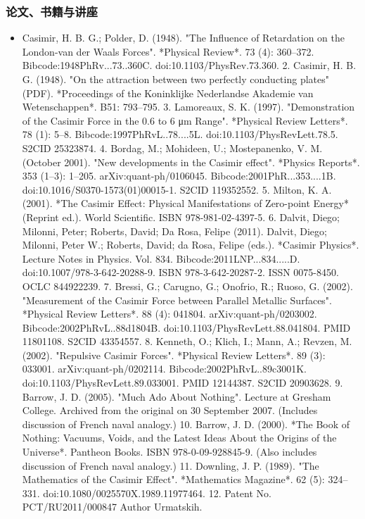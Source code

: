 \subsubsection{论文、书籍与讲座}
\begin{itemize}
\item Casimir, H. B. G.; Polder, D. (1948). "The Influence of Retardation on the London-van der Waals Forces". *Physical Review*. 73 (4): 360–372. Bibcode:1948PhRv...73..360C. doi:10.1103/PhysRev.73.360.
2. Casimir, H. B. G. (1948). "On the attraction between two perfectly conducting plates" (PDF). *Proceedings of the Koninklijke Nederlandse Akademie van Wetenschappen*. B51: 793–795.
3. Lamoreaux, S. K. (1997). "Demonstration of the Casimir Force in the 0.6 to 6 μm Range". *Physical Review Letters*. 78 (1): 5–8. Bibcode:1997PhRvL..78....5L. doi:10.1103/PhysRevLett.78.5. S2CID 25323874.
4. Bordag, M.; Mohideen, U.; Mostepanenko, V. M. (October 2001). "New developments in the Casimir effect". *Physics Reports*. 353 (1–3): 1–205. arXiv:quant-ph/0106045. Bibcode:2001PhR...353....1B. doi:10.1016/S0370-1573(01)00015-1. S2CID 119352552.
5. Milton, K. A. (2001). *The Casimir Effect: Physical Manifestations of Zero-point Energy* (Reprint ed.). World Scientific. ISBN 978-981-02-4397-5.
6. Dalvit, Diego; Milonni, Peter; Roberts, David; Da Rosa, Felipe (2011). Dalvit, Diego; Milonni, Peter W.; Roberts, David; da Rosa, Felipe (eds.). *Casimir Physics*. Lecture Notes in Physics. Vol. 834. Bibcode:2011LNP...834.....D. doi:10.1007/978-3-642-20288-9. ISBN 978-3-642-20287-2. ISSN 0075-8450. OCLC 844922239.
7. Bressi, G.; Carugno, G.; Onofrio, R.; Ruoso, G. (2002). "Measurement of the Casimir Force between Parallel Metallic Surfaces". *Physical Review Letters*. 88 (4): 041804. arXiv:quant-ph/0203002. Bibcode:2002PhRvL..88d1804B. doi:10.1103/PhysRevLett.88.041804. PMID 11801108. S2CID 43354557.
8. Kenneth, O.; Klich, I.; Mann, A.; Revzen, M. (2002). "Repulsive Casimir Forces". *Physical Review Letters*. 89 (3): 033001. arXiv:quant-ph/0202114. Bibcode:2002PhRvL..89c3001K. doi:10.1103/PhysRevLett.89.033001. PMID 12144387. S2CID 20903628.
9. Barrow, J. D. (2005). "Much Ado About Nothing". Lecture at Gresham College. Archived from the original on 30 September 2007. (Includes discussion of French naval analogy.)
10. Barrow, J. D. (2000). *The Book of Nothing: Vacuums, Voids, and the Latest Ideas About the Origins of the Universe*. Pantheon Books. ISBN 978-0-09-928845-9. (Also includes discussion of French naval analogy.)
11. Downling, J. P. (1989). "The Mathematics of the Casimir Effect". *Mathematics Magazine*. 62 (5): 324–331. doi:10.1080/0025570X.1989.11977464.
12. Patent No. PCT/RU2011/000847 Author Urmatskih.
\end{itemize}